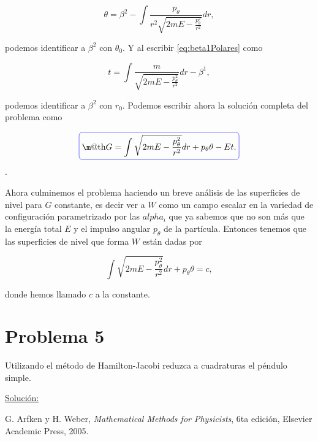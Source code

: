 \documentclass[a4paper,10pt]{article}
\makeatletter
\numberwithin{equation}{section}
\newcommand*{\boxcolor}{blue}
\renewcommand{\boxed}[1]{\textcolor{\boxcolor}{%
\tikz[baseline={([yshift=-1ex]current bounding box.center)}] \node [rectangle, minimum width=1ex,rounded corners,draw] {\normalcolor\m@th$\displaystyle#1$};}}
\makeatother
\begin{document}
\begin{equation}
 \theta =   \beta^2  - \int \frac{p_\theta}{r^2\sqrt{2mE - \frac{p_\theta^2}{r^2}}}dr,
\end{equation}

podemos identificar a $\beta^2$ con $\theta_0$. Y al escribir \eqref{eq:beta1Polares} 
como 

\begin{equation}
 t = \int \frac{m}{\sqrt{2mE - \frac{p_\theta^2}{r^2}}}dr - \beta^1,
\end{equation}

podemos identificar a $\beta^2$ con $r_0$. Podemos escribir ahora la solución 
completa del problema como

\begin{equation}
 \boxed{G = \int \sqrt{2mE - \frac{p_\theta^2}{r^2}} dr + p_\theta\theta - Et.}
\end{equation}.

Ahora culminemos el problema haciendo un breve análisis de las superficies de nivel 
para $G$ constante, es decir ver a $W$ como un campo escalar en la variedad de 
configuración parametrizado por las $alpha_i$ que ya sabemos que no son más que 
la energía total $E$ y el impulso angular $p_\theta$ de la partícula. Entonces tenemos 
que las superficies de nivel que forma $W$ están dadas por 

\begin{equation}
 \int \sqrt{2mE - \frac{p_\theta^2}{r^2}} dr + p_\theta\theta = c,
\end{equation}

donde hemos llamado $c$ a la constante.




\section{Problema 5}

Utilizando el método de Hamilton-Jacobi reduzca a cuadraturas el péndulo simple. 

\vspace{.3cm}

\underline{Solución:} \vspace{.3cm}

\begin{thebibliography}{10}
G. Arfken y H. Weber, \emph{Mathematical Methods for Physicists}, 6ta edición, Elsevier 
Academic Press, 2005.
\end{thebibliography}
\end{document}
